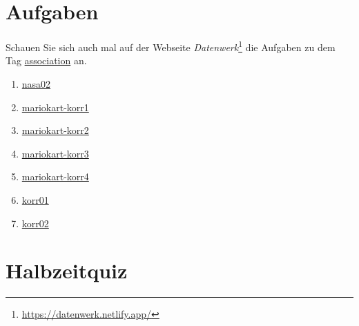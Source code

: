 \documentclass[
  a4paper,
]{scrbook}
\providecommand{\tightlist}{%
  \setlength{\itemsep}{0pt}\setlength{\parskip}{0pt}}\usepackage{longtable,booktabs,array}
\theoremstyle{definition}
\theoremstyle{definition}
\theoremstyle{definition}
\theoremstyle{remark}
\begin{document}
\section{Aufgaben}\label{aufgaben-6}

Schauen Sie sich auch mal auf der Webseite \emph{Datenwerk}\footnote{\url{https://datenwerk.netlify.app/}}
die Aufgaben zu dem Tag
\href{https://datenwerk.netlify.app/\#category=association}{association}
an.

\begin{enumerate}
\def\labelenumi{\arabic{enumi}.}
\tightlist
\item
  \href{https://datenwerk.netlify.app/posts/nasa02/nasa02.html}{nasa02}
\item
  \href{https://datenwerk.netlify.app/posts/mariokart-korr1/mariokart-korr1.html}{mariokart-korr1}
\item
  \href{https://datenwerk.netlify.app/posts/mariokart-korr2/mariokart-korr2.html}{mariokart-korr2}
\item
  \href{https://datenwerk.netlify.app/posts/mariokart-korr3/mariokart-korr3.html}{mariokart-korr3}
\item
  \href{https://datenwerk.netlify.app/posts/mariokart-korr4/mariokart-korr4.html}{mariokart-korr4}
\item
  \href{https://datenwerk.netlify.app/posts/korr01/korr01.html}{korr01}
\item
  \href{https://datenwerk.netlify.app/posts/korr02/korr02.html}{korr02}
\end{enumerate}

\section{Halbzeitquiz}\label{halbzeitquiz}
\end{document}
